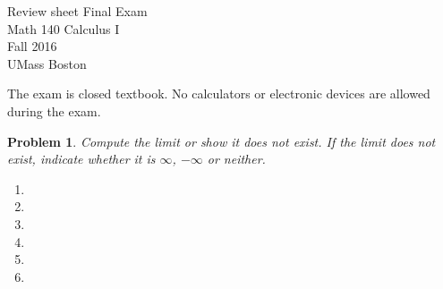 \documentclass{article}
\renewcommand{\fcProblemRef}{\theproblem.\theenumi}
\newtheorem{problem}{Problem}
\begin{document}
\begin{center}
\Large
Review sheet Final Exam \\ Math 140 Calculus I \\ \normalsize Fall 2016 \\ UMass Boston
\end{center}


\noindent The exam is closed textbook. {\sc No calculators or electronic devices are allowed during the exam.} %

\begin{problem}Compute the limit or show it does not exist. If the limit does not exist, indicate whether it is $\infty$, $-\infty$ or neither.
\begin{multicols}{2}
\begin{enumerate}[ref={\fcProblemRef}]
\item 
\item 
\item 
\item 
\item 
\item 

\end{enumerate}
\end{multicols}
\end{problem}


\end{document}

